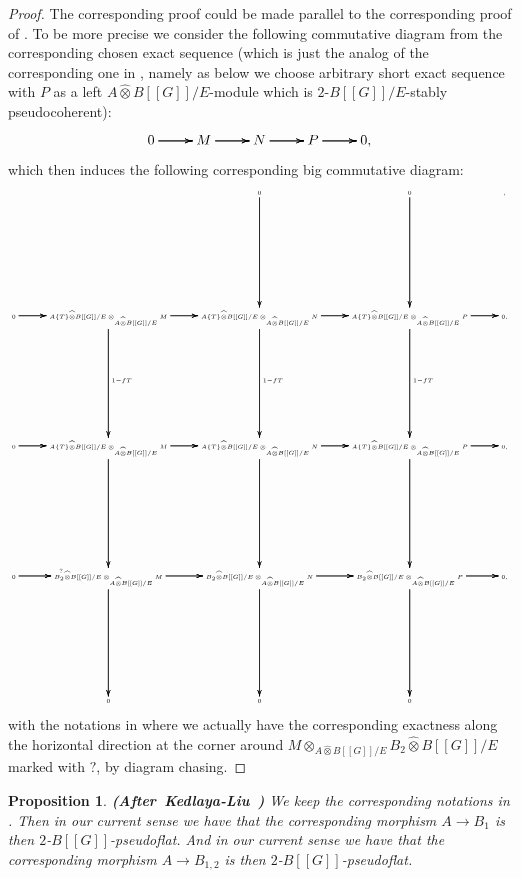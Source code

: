 \documentclass[12pt]{amsart}
\newtheorem{proposition}[theorem]{Proposition}
\theoremstyle{definition}
\numberwithin{equation}{section}
\begin{document}
\begin{proof}
The corresponding proof could be made parallel to the corresponding proof of \cite[Lemma 2.4.12]{KL2}. To be more precise we consider the following commutative diagram from the corresponding chosen exact sequence (which is just the analog of the corresponding one in \cite[Lemma 2.4.12]{KL2}, namely as below we choose arbitrary short exact sequence with $P$ as a left $A\widehat{\otimes}B[[G]]/E$-module which is $2$-$B[[G]]/E$-stably pseudocoherent):
\[
\xymatrix@C+0pc@R+0pc{
0   \ar[r]\ar[r]\ar[r] &M \ar[r]\ar[r]\ar[r] &N \ar[r]\ar[r]\ar[r] & P \ar[r]\ar[r]\ar[r] &0,
}
\]
which then induces the following corresponding big commutative diagram:
\[\tiny
\xymatrix@C+0pc@R+6pc{
& &0 \ar[d]\ar[d]\ar[d] &0 \ar[d]\ar[d]\ar[d] &,\\
0   \ar[r]\ar[r]\ar[r]  &{A\{T\}\widehat{\otimes}B[[G]]/E}\otimes_{A\widehat{\otimes}B[[G]]/E} M \ar[r]\ar[r]\ar[r] \ar[d]^{1-fT}\ar[d]\ar[d] &{A\{T\}\widehat{\otimes}B[[G]]/E}\otimes_{A\widehat{\otimes}B[[G]]/E} N \ar[r]\ar[r]\ar[r] \ar[d]^{1-fT}\ar[d]\ar[d] &{A\{T\}\widehat{\otimes}B[[G]]/E} \otimes_{A\widehat{\otimes}B[[G]]/E}P \ar[r]\ar[r]\ar[r] \ar[d]^{1-fT}\ar[d]\ar[d] &0,\\
0   \ar[r]\ar[r]\ar[r] &{A\{T\}\widehat{\otimes}B[[G]]/E}\otimes_{A\widehat{\otimes}B[[G]]/E}M  \ar[r]\ar[r]\ar[r] \ar[d]\ar[d]\ar[d] &{A\{T\}\widehat{\otimes}B[[G]]/E} \otimes_{A\widehat{\otimes}B[[G]]/E}N\ar[r]\ar[r]\ar[r] \ar[d]\ar[d]\ar[d] & {A\{T\}\widehat{\otimes}B[[G]]/E}\otimes_{A\widehat{\otimes}B[[G]]/E}P \ar[r]\ar[r]\ar[r] \ar[d]\ar[d]\ar[d] &0,\\
0  \ar[r]^?\ar[r]\ar[r] &{B_2\widehat{\otimes}B[[G]]/E}\otimes_{A\widehat{\otimes}B[[G]]/E} M \ar[r]\ar[r]\ar[r] \ar[d]\ar[d]\ar[d] &{B_2\widehat{\otimes}B[[G]]/E}\otimes_{A\widehat{\otimes}B[[G]]/E}N \ar[r]\ar[r]\ar[r] \ar[d]\ar[d]\ar[d] & {B_2\widehat{\otimes}B[[G]]/E}\otimes_{A\widehat{\otimes}B[[G]]/E} P \ar[r]\ar[r]\ar[r] \ar[d]\ar[d]\ar[d] &0,\\
&0&0&0
}
\]
with the notations in \cite[Lemma 2.4.10]{KL2} where we actually have the corresponding exactness along the horizontal direction at the corner around $M\otimes_{A\widehat{\otimes}B[[G]]/E} {B_2\widehat{\otimes}B[[G]]/E}$ marked with $?$, by diagram chasing.
\end{proof}


\begin{proposition} \mbox{\bf{(After Kedlaya-Liu \cite[Lemma 2.4.13]{KL2})}} \label{proposition3.10}
We keep the corresponding notations in \cite[Lemma 2.4.10]{KL2}. Then in our current sense we have that the corresponding morphism $A\rightarrow B_1$ is then $2$-$B[[G]]$-pseudoflat. And in our current sense we have that the corresponding morphism $A\rightarrow B_{1,2}$ is then $2$-$B[[G]]$-pseudoflat. 
\end{proposition}
\end{document}
